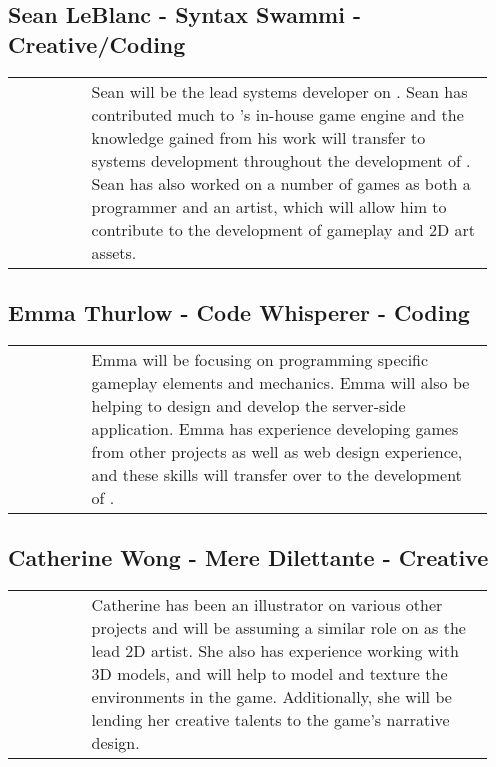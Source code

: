 \subsection{Sean LeBlanc - Syntax Swammi - Creative/Coding}
\begin{tabular}{m{0.15\linewidth} m{0.8\linewidth}}
\raisebox{-\linewidth}{\texttt{[image: images/sean]}} & Sean will be the lead systems developer on \ourgame{}. Sean has contributed much to \ourteam{}'s in-house game engine and the knowledge gained from his work will transfer to systems development throughout the development of \ourgame{}. Sean has also worked on a number of games as both a programmer and an artist, which will allow him to contribute to the development of gameplay and 2D art assets.\\
\end{tabular}

\subsection{Emma Thurlow - Code Whisperer - Coding}
\begin{tabular}{m{0.15\linewidth} m{0.8\linewidth}}
\raisebox{-\linewidth}{\texttt{[image: images/emma]}} & Emma will be focusing on programming specific gameplay elements and mechanics. Emma will also be helping to design and develop the server-side application. Emma has experience developing games from other projects as well as web design experience, and these skills will transfer over to the development of \ourgame{}.\\
\end{tabular}

\subsection{Catherine Wong - Mere Dilettante - Creative}
\begin{tabular}{m{0.15\linewidth} m{0.8\linewidth}}
\raisebox{-\linewidth}{\texttt{[image: images/cat]}} & Catherine has been an illustrator on various other projects and will be assuming a similar role on \ourgame{} as the lead 2D artist. She also has experience working with 3D models, and will help to model and texture the environments in the game. Additionally, she will be lending her creative talents to the game's narrative design.\\
\end{tabular}